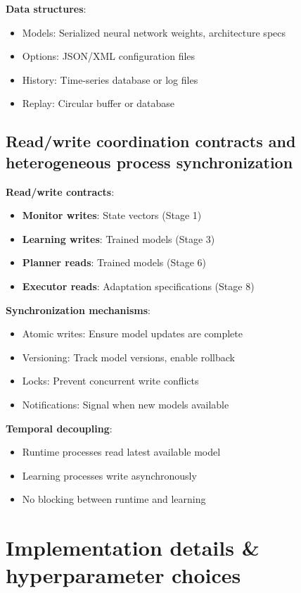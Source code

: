 \documentclass[11pt,a4paper]{article}
\begin{document}
\textbf{Data structures}:
\begin{itemize}
    \item Models: Serialized neural network weights, architecture specs
    \item Options: JSON/XML configuration files
    \item History: Time-series database or log files
    \item Replay: Circular buffer or database
\end{itemize}

\subsection{Read/write coordination contracts and heterogeneous process synchronization}

\textbf{Read/write contracts}:
\begin{itemize}
    \item \textbf{Monitor writes}: State vectors (Stage 1)
    \item \textbf{Learning writes}: Trained models (Stage 3)
    \item \textbf{Planner reads}: Trained models (Stage 6)
    \item \textbf{Executor reads}: Adaptation specifications (Stage 8)
\end{itemize}

\textbf{Synchronization mechanisms}:
\begin{itemize}
    \item Atomic writes: Ensure model updates are complete
    \item Versioning: Track model versions, enable rollback
    \item Locks: Prevent concurrent write conflicts
    \item Notifications: Signal when new models available
\end{itemize}

\textbf{Temporal decoupling}:
\begin{itemize}
    \item Runtime processes read latest available model
    \item Learning processes write asynchronously
    \item No blocking between runtime and learning
\end{itemize}

\section{Implementation details \& hyperparameter choices}
\end{document}
